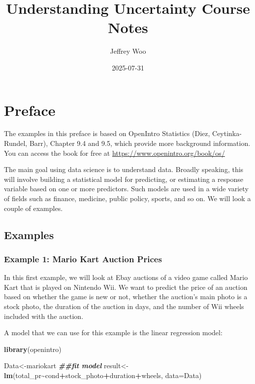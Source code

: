 \documentclass[
]{book}
\title{Understanding Uncertainty Course Notes}
\author{Jeffrey Woo}
\date{2025-07-31}
\newenvironment{Shaded}{\begin{snugshade}}{\end{snugshade}}
\newcommand{\AttributeTok}[1]{\textcolor[rgb]{0.13,0.29,0.53}{#1}}
\newcommand{\DocumentationTok}[1]{\textcolor[rgb]{0.56,0.35,0.01}{\textbf{\textit{#1}}}}
\newcommand{\FunctionTok}[1]{\textcolor[rgb]{0.13,0.29,0.53}{\textbf{#1}}}
\newcommand{\NormalTok}[1]{#1}
\newcommand{\OtherTok}[1]{\textcolor[rgb]{0.56,0.35,0.01}{#1}}
\newcommand{\SpecialCharTok}[1]{\textcolor[rgb]{0.81,0.36,0.00}{\textbf{#1}}}
\begin{document}
\maketitle

{
\setcounter{tocdepth}{1}
\tableofcontents
}
\chapter*{Preface}\label{preface}

The examples in this preface is based on OpenIntro Statistics (Diez, Ceytinka-Rundel, Barr), Chapter 9.4 and 9.5, which provide more background information. You can access the book for free at \url{https://www.openintro.org/book/os/}

The main goal using data science is to understand data. Broadly speaking, this will involve building a statistical model for predicting, or estimating a response variable based on one or more predictors. Such models are used in a wide variety of fields such as finance, medicine, public policy, sports, and so on. We will look a couple of examples.

\section{Examples}\label{examples}

\subsection{Example 1: Mario Kart Auction Prices}\label{example-1-mario-kart-auction-prices}

In this first example, we will look at Ebay auctions of a video game called Mario Kart that is played on Nintendo Wii. We want to predict the price of an auction based on whether the game is new or not, whether the auction's main photo is a stock photo, the duration of the auction in days, and the number of Wii wheels included with the auction.

A model that we can use for this example is the linear regression model:

\begin{Shaded}
\begin{Highlighting}[]
\FunctionTok{library}\NormalTok{(openintro)}

\NormalTok{Data}\OtherTok{\textless{}{-}}\NormalTok{mariokart}
\DocumentationTok{\#\#fit model}
\NormalTok{result}\OtherTok{\textless{}{-}}\FunctionTok{lm}\NormalTok{(total\_pr}\SpecialCharTok{\textasciitilde{}}\NormalTok{cond}\SpecialCharTok{+}\NormalTok{stock\_photo}\SpecialCharTok{+}\NormalTok{duration}\SpecialCharTok{+}\NormalTok{wheels, }\AttributeTok{data=}\NormalTok{Data)}
\end{Highlighting}
\end{Shaded}
\end{document}
